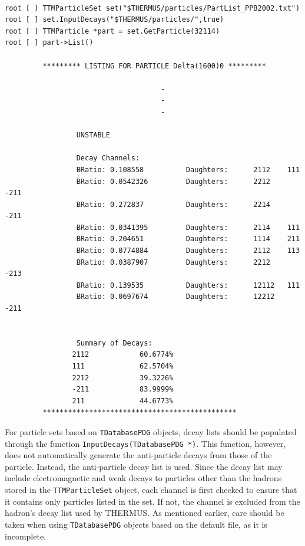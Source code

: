\documentclass{elsarticle}
\begin{document}
\small
\begin{verbatim}

root [ ] TTMParticleSet set("$THERMUS/particles/PartList_PPB2002.txt")
root [ ] set.InputDecays("$THERMUS/particles/",true)
root [ ] TTMParticle *part = set.GetParticle(32114)
root [ ] part->List()

         ********* LISTING FOR PARTICLE Delta(1600)0 *********

                                     -
                                     -
                                     -

                 UNSTABLE

                 Decay Channels:
                 BRatio: 0.108558          Daughters:      2112    111
                 BRatio: 0.0542326         Daughters:      2212    -211
                 BRatio: 0.272837          Daughters:      2214    -211
                 BRatio: 0.0341395         Daughters:      2114    111
                 BRatio: 0.204651          Daughters:      1114    211
                 BRatio: 0.0774884         Daughters:      2112    113
                 BRatio: 0.0387907         Daughters:      2212    -213
                 BRatio: 0.139535          Daughters:      12112   111
                 BRatio: 0.0697674         Daughters:      12212   -211


                 Summary of Decays:
                2112            60.6774%
                111             62.5704%
                2212            39.3226%
                -211            83.9999%
                211             44.6773%
         **********************************************

\end{verbatim}
\normalsize

For particle sets based on \texttt{TDatabasePDG} objects, decay lists should be populated through the function 
\texttt{InputDecays(TDatabasePDG *)}. This function, however, does not automatically generate 
the anti-particle decays from those of the particle. Instead, the anti-particle decay list is used. 
Since the decay list may include electromagnetic and weak decays to particles other than the 
hadrons stored in the \texttt{TTMParticleSet} object, each channel is first checked to ensure that it 
contains only particles listed in the set. If not, the channel is excluded from the hadron's decay 
list used by THERMUS. As mentioned earlier, care should be taken when using \texttt{TDatabasePDG} objects 
based on the default file, as it is incomplete.\\ 
\end{document}
